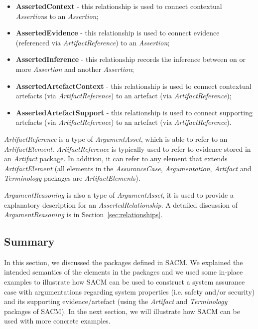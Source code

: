 \begin{itemize}
	\item \textbf{AssertedContext} - this relationship is used to connect contextual \textit{Assertion}s to an \textit{Assertion};
	\item \textbf{AssertedEvidence} - this relationship is used to connect evidence (referenced via \textit{ArtifactReference}) to an \textit{Assertion};
	\item \textbf{AssertedInference} - this relationship records the inference between on or more \textit{Assertion} and another \textit{Assertion};
	\item \textbf{AssertedArtefactContext} - this relationship is used to connect contextual artefacts (via \textit{ArtifactReference}) to an artefact (via \textit{ArtifactReference});
	\item \textbf{AssertedArtefactSupport} - this relationship is used to connect supporting artefacts (via \textit{ArtifactReference}) to an artefact (via \textit{ArtifactReference}).
\end{itemize}

\textit{ArtifactReference} is a type of \textit{ArgumentAsset}, which is able to refer to an \textit{ArtifactElement}.
\textit{ArtifactReference} is typically used to refer to evidence stored in an \textit{Artifact} package. 
In addition, it can refer to any element that extends \textit{ArtifactElement} (all elements in the \textit{AssuranceCase}, \textit{Argumentation}, \textit{Artifact} and \textit{Terminology} packages are \textit{ArtifactElement}s).

\textit{ArgumentReasoning} is also a type of \textit{ArgumentAsset}, it is used to provide a explanatory description for an \textit{AssertedRelationship}. 
A detailed discussion of \textit{ArgumentReasoning} is in Section~\ref{sec:relationships}.

\subsection{Summary}
In this section, we discussed the packages defined in SACM. We explained the intended semantics of the elements in the packages and we used some in-place examples to illustrate how SACM can be used to construct a system assurance case with argumentations regarding system properties (i.e. safety and/or security) and its supporting evidence/artefact (using the \textit{Artifact} and \textit{Terminology} packages of SACM). 
In the next section, we will illustrate how SACM can be used with more concrete examples.

